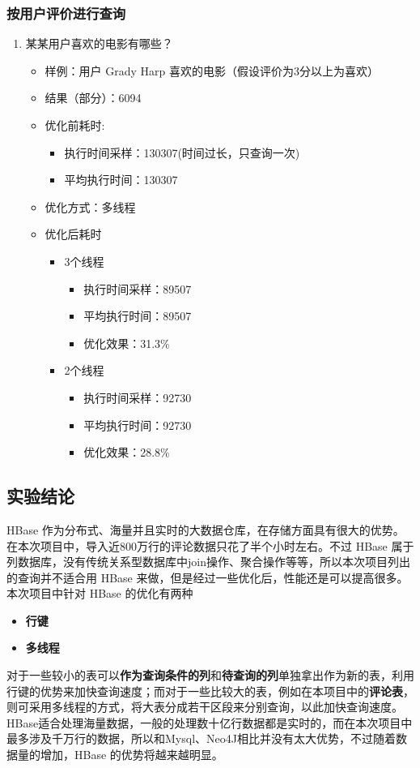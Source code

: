 \documentclass{ctexrep}
\begin{document}
		\subsubsection{按用户评价进行查询}
	    \begin{enumerate}
	        \item 某某用户喜欢的电影有哪些？
    	        \begin{itemize}
    	            \item 样例：用户 Grady Harp 喜欢的电影（假设评价为3分以上为喜欢）
    	            \item 结果（部分）：6094
					\item 优化前耗时:
						\begin{itemize}
							\item 执行时间采样：130307(时间过长，只查询一次)
							\item 平均执行时间：130307
						\end{itemize}
					\item 优化方式：多线程
					\item 优化后耗时
					\begin{itemize}
						\item 3个线程
						\begin{itemize}
							\item 执行时间采样：89507
							\item 平均执行时间：89507
							\item 优化效果：31.3\%
						\end{itemize}
						\item 2个线程
						\begin{itemize}
							\item 执行时间采样：92730
							\item 平均执行时间：92730
							\item 优化效果：28.8\%
						\end{itemize}
					\end{itemize}
				\end{itemize}
		\end{enumerate}
	\subsection{实验结论}
	HBase 作为分布式、海量并且实时的大数据仓库，在存储方面具有很大的优势。在本次项目中，导入近800万行的评论数据只花了半个小时左右。不过 HBase 属于列数据库，没有传统关系型数据库中join操作、聚合操作等等，所以本次项目列出的查询并不适合用 HBase 来做，但是经过一些优化后，性能还是可以提高很多。
	本次项目中针对 HBase 的优化有两种
	\begin{itemize}
		\item \textbf{行键}
		\item \textbf{多线程}
	\end{itemize}
	对于一些较小的表可以\textbf{作为查询条件的列}和\textbf{待查询的列}单独拿出作为新的表，利用行键的优势来加快查询速度；而对于一些比较大的表，例如在本项目中的\textbf{评论表}，则可采用多线程的方式，将大表分成若干区段来分别查询，以此加快查询速度。HBase适合处理海量数据，一般的处理数十亿行数据都是实时的，而在本次项目中最多涉及千万行的数据，所以和Mysql、Neo4J相比并没有太大优势，不过随着数据量的增加，HBase 的优势将越来越明显。
\end{document}
